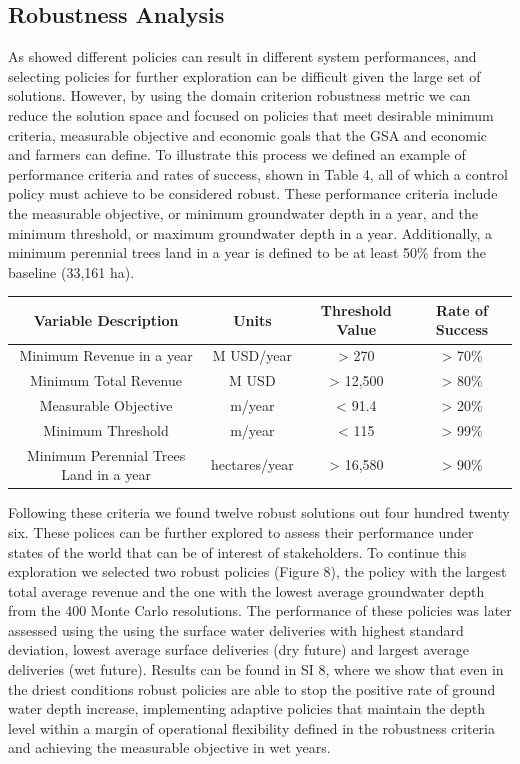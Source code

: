 \documentclass[11pt,a4paper]{article}
\begin{document}
\subsection{Robustness Analysis}

As showed different policies can result in different system performances, and selecting policies for further exploration can be difficult given the large set of solutions. However, by using the domain criterion robustness metric we can reduce the solution space and focused on policies that meet desirable minimum criteria, measurable objective and economic goals that the GSA and economic and farmers can define. To illustrate this process we defined an example of performance criteria and rates of success, shown in Table 4, all of which a control policy must achieve to be considered robust. These performance criteria include the measurable objective, or minimum groundwater depth in a year, and the minimum threshold, or maximum groundwater depth in a year. Additionally, a minimum perennial trees land in a year is defined to be at least 50\% from the baseline (33,161 ha). 

\begin{center}
\begin{tabular}{ |c|c|c|c| }
 \hline
 Variable Description & Units & Threshold Value & Rate of Success \\ 
 \hline
Minimum Revenue in a year  & M USD/year  & > 270 & > 70\% \\
Minimum Total Revenue  & M USD  & > 12,500 & > 80\% \\
Measurable Objective & m/year  & < 91.4 & > 20\%  \\
Minimum Threshold & m/year  & < 115 & > 99\%  \\
Minimum Perennial Trees Land in a year & hectares/year & > 16,580 & > 90\%  \\
\hline
\end{tabular}
\end{center}

Following these criteria we found twelve robust solutions out four hundred twenty six. These polices can be further explored to assess their performance under states of the world that can be of interest of stakeholders. To continue this exploration we selected two robust policies (Figure 8), the policy with the largest total average revenue and the one with the lowest average groundwater depth from the 400 Monte Carlo resolutions.
The performance of these policies was later assessed using the using the surface water deliveries with highest standard deviation, lowest average surface deliveries (dry future) and largest average deliveries (wet future). Results can be found in SI 8, where we show that even in the driest conditions robust policies are able to stop the positive rate of ground water depth increase, implementing adaptive policies that maintain the depth level within a margin of operational flexibility defined in the robustness criteria and achieving the measurable objective in wet years. 
\end{document}
